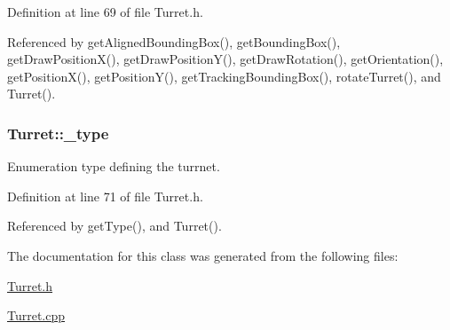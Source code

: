 Definition at line 69 of file Turret.\-h.



Referenced by get\-Aligned\-Bounding\-Box(), get\-Bounding\-Box(), get\-Draw\-Position\-X(), get\-Draw\-Position\-Y(), get\-Draw\-Rotation(), get\-Orientation(), get\-Position\-X(), get\-Position\-Y(), get\-Tracking\-Bounding\-Box(), rotate\-Turret(), and Turret().

\hypertarget{classTurret_afadbbb1f31cce1eb6b267afebebd14f0}{
\subsubsection[{\-\_\-type}]{ Turret\-::\-\_\-type\hspace{0.3cm}{\ttfamily [private]}}}\label{classTurret_afadbbb1f31cce1eb6b267afebebd14f0}


Enumeration type defining the turrnet. 



Definition at line 71 of file Turret.\-h.



Referenced by get\-Type(), and Turret().



The documentation for this class was generated from the following files\-:\begin{DoxyCompactItemize}
\item 
\hyperlink{Turret_8h}{Turret.\-h}\item 
\hyperlink{Turret_8cpp}{Turret.\-cpp}\end{DoxyCompactItemize}
